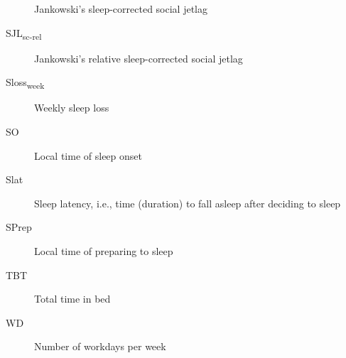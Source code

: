 \begin{siglas}
\begin{description}
Jankowski's sleep-corrected social jetlag
\item[SJL\textsubscript{sc-rel}]
\hspace{20cm}

Jankowski's relative sleep-corrected social jetlag
\item[Sloss\textsubscript{week}]
\hspace{20cm}

Weekly sleep loss
\item[SO]
\hspace{20cm}

Local time of sleep onset
\item[Slat]
\hspace{20cm}

Sleep latency, i.e., time (duration) to fall asleep after deciding to
sleep
\item[SPrep]
\hspace{20cm}

Local time of preparing to sleep
\item[TBT]
\hspace{20cm}

Total time in bed
\item[WD]
\hspace{20cm}

Number of workdays per week
\end{description}

\end{siglas}


